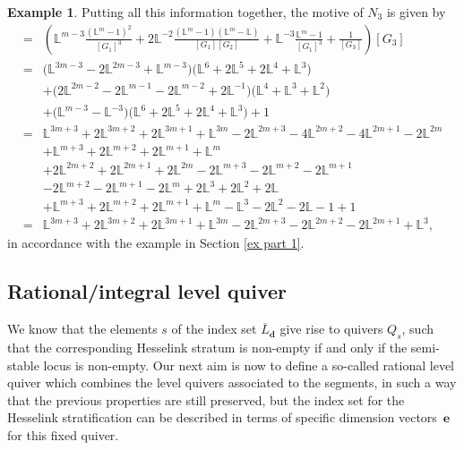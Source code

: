 \documentclass[10pt,a4paper]{amsart}
\numberwithin{equation}{section}
\theoremstyle{definition}
\newtheorem{Example}[Theorem]{Example}
\begin{document}
\begin{Example}
Putting all this information together, the motive of $N_3$ is given by
\begin{align*}
[N_3]={}& \left( \mathbb{L}^{m-3} \frac{(\mathbb{L}^{m}-1)^2}{[G_1]^3} + 2 \mathbb{L}^{-2} \frac{(\mathbb{L}^m -1)(\mathbb{L}^m-\mathbb{L})}{[G_1][G_2]} + \mathbb{L}^{-3} \frac{\mathbb{L}^m -1}{[G_1]^3} + \frac{1}{[G_3]}\right) [G_3] \\
={}& \bigl(\mathbb{L}^{3m-3} -2 \mathbb{L}^{2m-3}+\mathbb{L}^{m-3}\bigr) \bigl( \mathbb{L}^6 + 2 \mathbb{L}^5 +2 \mathbb{L}^4 + \mathbb{L}^3\bigr) \\
& + \bigl(2\mathbb{L}^{2m-2} - 2 \mathbb{L}^{m-1}-2 \mathbb{L}^{m-2}+2\mathbb{L}^{-1}\bigr) \bigl( \mathbb{L}^4 + \mathbb{L}^3 + \mathbb{L}^2 \bigr) \\
& + \bigl(\mathbb{L}^{m-3} - \mathbb{L}^{-3}\bigr) \bigl(\mathbb{L}^6 + 2 \mathbb{L}^5 +2 \mathbb{L}^4 + \mathbb{L}^3 \bigr) +1\\
={}& \mathbb{L}^{3m+3} + 2\mathbb{L}^{3m+2} + 2\mathbb{L}^{3m+1} + \mathbb{L}^{3m}-2\mathbb{L}^{2m+3} - 4\mathbb{L}^{2m+2} - 4\mathbb{L}^{2m+1} - 2\mathbb{L}^{2m} \\
& + \mathbb{L}^{m+3} + 2\mathbb{L}^{m+2} +2\mathbb{L}^{m+1} + \mathbb{L}^{m} \\
& + 2 \mathbb{L}^{2m+2} +2 \mathbb{L}^{2m+1} +2 \mathbb{L}^{2m} -
2 \mathbb{L}^{m+3} -2 \mathbb{L}^{m+2} -2 \mathbb{L}^{m+1} \\
& - 2 \mathbb{L}^{m+2} -2 \mathbb{L}^{m+1} -2 \mathbb{L}^{m} + 2 \mathbb{L}^{3} + 2 \mathbb{L}^2 +2 \mathbb{L} \\
& + \mathbb{L}^{m+3} + 2 \mathbb{L}^{m+2} + 2\mathbb{L}^{m+1} + \mathbb{L}^{m} - \mathbb{L}^3 - 2 \mathbb{L}^2 - 2 \mathbb{L} - 1 +1 \\
={}& \mathbb{L}^{3m+3} + 2\mathbb{L}^{3m+2} + 2\mathbb{L}^{3m+1} + \mathbb{L}^{3m} - 2\mathbb{L}^{2m+3} - 2\mathbb{L}^{2m+2} -2 \mathbb{L}^{2m+1} + \mathbb{L}^3 ,
\end{align*}
 in accordance with the example in Section \ref{ex part 1}.
\end{Example}

\subsection{Rational/integral level quiver}

We know that the elements $s$ of the index set ${\overline{L}_{\mathbf{d}}}$ give rise to quivers $Q_s$, such that the corresponding Hesselink stratum is non-empty if and only if the semi-stable locus is non-empty. Our next aim is now to define a so-called rational level quiver which combines the level quivers associated to the segments, in such a way that the previous properties are still preserved, but the index set for the Hesselink stratification can be described in terms of specific dimension vectors~$\mathbf{e}$ for this fixed quiver.
\end{document}
